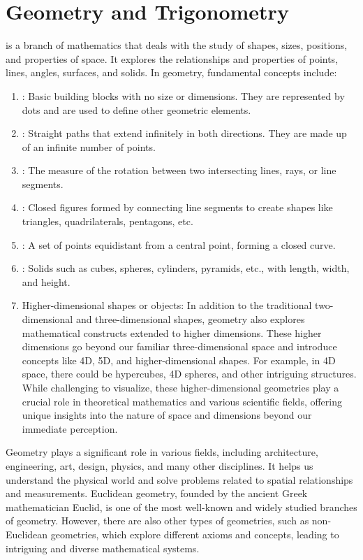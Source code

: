 \chapter{Geometry and Trigonometry}
\thispagestyle{fancy}

 is a branch of mathematics that deals with the study of shapes, sizes, positions, and properties of space. It explores the relationships and properties of points, lines, angles, surfaces, and solids. In geometry, fundamental concepts include:

\begin{enumerate}
	\item {}: Basic building blocks with no size or dimensions. They are represented by dots and are used to define other geometric elements.
	\item {}: Straight paths that extend infinitely in both directions. They are made up of an infinite number of points.
	\item {}: The measure of the rotation between two intersecting lines, rays, or line segments.
	\item {}: Closed figures formed by connecting line segments to create shapes like triangles, quadrilaterals, pentagons, etc.
	\item {}: A set of points equidistant from a central point, forming a closed curve.
	\item {}: Solids such as cubes, spheres, cylinders, pyramids, etc., with length, width, and height.
	\item Higher-dimensional shapes or objects: In addition to the traditional two-dimensional and three-dimensional shapes, geometry also explores mathematical constructs extended to higher dimensions. These higher dimensions go beyond our familiar three-dimensional space and introduce concepts like 4D, 5D, and higher-dimensional shapes. For example, in 4D space, there could be hypercubes, 4D spheres, and other intriguing structures. While challenging to visualize, these higher-dimensional geometries play a crucial role in theoretical mathematics and various scientific fields, offering unique insights into the nature of space and dimensions beyond our immediate perception.
\end{enumerate}

Geometry plays a significant role in various fields, including architecture, engineering, art, design, physics, and many other disciplines. It helps us understand the physical world and solve problems related to spatial relationships and measurements. Euclidean geometry, founded by the ancient Greek mathematician Euclid, is one of the most well-known and widely studied branches of geometry. However, there are also other types of geometries, such as non-Euclidean geometries, which explore different axioms and concepts, leading to intriguing and diverse mathematical systems.